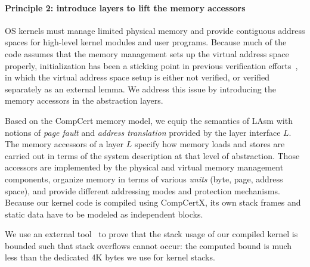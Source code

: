 
\paragraph{Principle 2: introduce layers to
lift the memory accessors}
OS kernels must manage limited physical memory and
provide contiguous address spaces
for high-level kernel modules and user programs.
Because much of the code assumes that 
the memory management sets up the virtual address space properly,
initialization has been a sticking point
in previous verification efforts~\cite{klein2009sel4, vaynberg12},
in which the virtual address space setup is either not verified,
or verified separately as an external lemma.
We address this issue by introducing the memory accessors in the abstraction layers.

Based on the CompCert memory model,
we equip the  semantics of LAsm with notions of \emph{page fault} and \emph{address translation} provided by the layer interface $L$.
The memory accessors of a layer $L$
specify how memory loads and stores are carried out
in terms of the system description at that level of abstraction.
Those accessors are implemented by the physical and virtual memory management components,
 organize memory in terms of various \emph{units} (byte, page, address space),
and provide different addressing modes and protection mechanisms.
Because our kernel code is compiled using CompCertX,
its own stack frames and static data have to be modeled as independent blocks.
We use an external tool~\cite{veristack}
to prove that the stack usage of our compiled kernel is bounded
such that stack overflows cannot occur:
the computed bound is much less than the dedicated 4K bytes we use
for kernel stacks.

